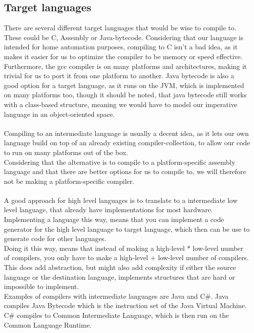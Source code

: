 \subsection{Target languages}\label{CodeGen:TargetLanguage}
There are several different target languages that would be wise to compile to. These could be C, Assembly or Java-bytecode. Considering that our language is intended for home automation purposes, compiling to C isn't a bad idea, as it makes it easier for us to optimize the compiler to be memory or speed effective.\\
Furthermore, the gcc compiler is on many platforms and architectures, making it trivial for us to port it from one platform to another. Java bytecode is also a good option for a target language, as it runs on the JVM, which is implemented on many platforms too, though it should be noted, that java bytecode still works with a class-based structure, meaning we would have to model our imperative language in an object-oriented space.
\\\\
Compiling to an intermediate language is usually a decent idea, as it lets our own language build on top of an already existing compiler-collection, to allow our code to run on many platforms out of the box.\\
Considering that the alternative is to compile to a platform-specific assembly language and that there are better options for us to compile to, we will therefore not be making a platform-specific compiler.
\\\\
A good approach for high level languages is to translate to a intermediate low level language, that already have implementations for most hardware.\\
Implementing a language this way, means that you can implement a code generator for the high level language to target language, which then can be use to generate code for other languages.\\
Doing it this way, means that instead of making a high-level $*$ low-level number of compilers, you only have to make a high-level $+$ low-level number of compilers.\\
This does add abstraction, but might also add complexity if either the source language or the destination language, implements structures that are hard or impossible to implement.\\
Examples of compilers with intermediate languages are Java and C\#. Java compiles Java Bytecode which is the instruction set of the Java Virtual Machine. C\# compiles to Common Intermediate Language, which is then run on the Common Language Runtime.

